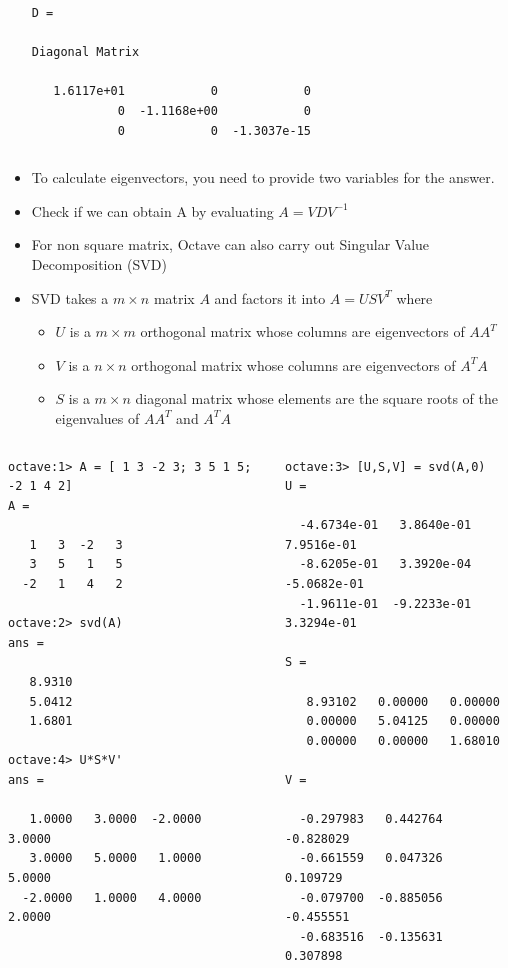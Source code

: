\documentclass[t,compress,xcolor=svgnames]{beamer}
\begin{document}
\begin{frame}
\begin{itemize}
{\begin{columns}
\begin{verbatim}
D =

Diagonal Matrix

   1.6117e+01            0            0
            0  -1.1168e+00            0
            0            0  -1.3037e-15
        \end{verbatim}
      \end{columns}
    }
    \item To calculate eigenvectors, you need to provide two variables for the answer.
    \item Check if we can obtain A by evaluating $A=VDV^{-1}$
    \framebreak
    \item For non square matrix, Octave can also carry out Singular Value Decomposition (SVD)
    \item SVD takes a $m\times n$ matrix $A$ and factors it into $A = USV^{T}$ where
    \begin{itemize}
      \item $U$ is a $m \times m$ orthogonal matrix whose columns are eigenvectors of $AA^T$ 
      \item $V$ is a $n \times n$ orthogonal matrix whose columns are eigenvectors of $A^TA$ 
      \item $S$ is a $m \times n$ diagonal matrix whose elements are the square roots of the eigenvalues of $AA^T$ and $A^TA$ 
    \end{itemize}
  \end{itemize}
    {\tiny
      \vspace{-0.2cm}
      \begin{columns}
        \column{5cm}
        \begin{verbatim}
octave:1> A = [ 1 3 -2 3; 3 5 1 5; -2 1 4 2]
A =

   1   3  -2   3
   3   5   1   5
  -2   1   4   2

octave:2> svd(A)
ans =

   8.9310
   5.0412
   1.6801

octave:4> U*S*V'
ans =

   1.0000   3.0000  -2.0000   3.0000
   3.0000   5.0000   1.0000   5.0000
  -2.0000   1.0000   4.0000   2.0000
        \end{verbatim}
        \column{5cm}
        \begin{verbatim}
octave:3> [U,S,V] = svd(A,0)
U =

  -4.6734e-01   3.8640e-01   7.9516e-01
  -8.6205e-01   3.3920e-04  -5.0682e-01
  -1.9611e-01  -9.2233e-01   3.3294e-01

S =

   8.93102   0.00000   0.00000
   0.00000   5.04125   0.00000
   0.00000   0.00000   1.68010

V =

  -0.297983   0.442764  -0.828029
  -0.661559   0.047326   0.109729
  -0.079700  -0.885056  -0.455551
  -0.683516  -0.135631   0.307898
        \end{verbatim}
      \end{columns}
    }
\end{frame}
\end{document}
